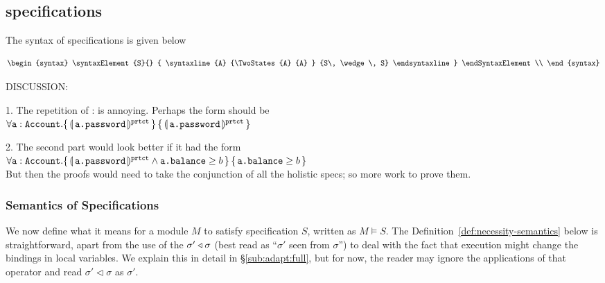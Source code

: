  \subsection{\SpecLang specifications}

 



\noindent
The syntax of  \SpecLang specifications is given below
 
\begin{definition}  

\noindent
{\emph{}}

\label{f:holistic-syntax}
\[
\begin{syntax}
\syntaxElement{S}{}
		{
		\syntaxline
				{A}				
				{\TwoStates {A} {A} }	
				{S\, \wedge \, S}
		\endsyntaxline
		}
\endSyntaxElement\\
\end{syntax}
\]
\end{definition}

\label{sec:adapt:motivate}





DISCUSSION:

1. The repetition of : is annoying. Perhaps the form should be 
\\
$\forall {\texttt{a}}:{\texttt{Account}}.{\{}\, \llparenthesis \, {\texttt{a.password}}\, \rrparenthesis^{{\texttt{prtct}}} \,{\}} \,{\{}\, \llparenthesis \, {\texttt{a.password}}\, \rrparenthesis^{{\texttt{prtct}}} \,{\}} $
 
2. The second part would look better if it had the form 
\\
$\forall {\texttt{a}}:{\texttt{Account}}.{\{}\, \llparenthesis \, {\texttt{a.password}}\, \rrparenthesis^{{\texttt{prtct}}} \wedge {\texttt{a.balance}}\geq b \,{\}} \,{\{}\, {\texttt{a.balance}}\geq b \,{\}} $
\\
But then the proofs would need to take the conjunction of all the holistic specs; so more work to prove them.

\subsubsection{ Semantics of \SpecLang Specifications}
We now  define what it means for  a module  $M$ to satisfy specification  $S$, written as $M \vDash S$. The
 Definition~\ref{def:necessity-semantics} below is straightforward, apart from  
the use of the $\sigma' \triangleleft \sigma$  (best read as ``$\sigma'$ seen
from $\sigma$'')
to deal with the fact that execution might  change the bindings in local variables.
We explain this in detail in   \S \ref{sub:adapt:full}, but for now, the reader may ignore the applications of that operator and
read $\sigma' \triangleleft \sigma$ as $\sigma'$.

